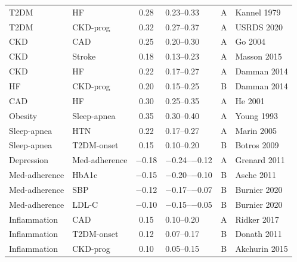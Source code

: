 \documentclass[runningheads]{llncs}
\begin{document}
{\begin{longtable}{@{}p{2.0cm}p{2.0cm}cp{1.4cm}cp{2.8cm}@{}}
T2DM & HF & 0.28 & 0.23--0.33 & A & Kannel 1979 \\
T2DM & CKD-prog & 0.32 & 0.27--0.37 & A & USRDS 2020 \\
CKD & CAD & 0.25 & 0.20--0.30 & A & Go 2004 \\
CKD & Stroke & 0.18 & 0.13--0.23 & A & Masson 2015 \\
CKD & HF & 0.22 & 0.17--0.27 & A & Damman 2014 \\
HF & CKD-prog & 0.20 & 0.15--0.25 & B & Damman 2014 \\
CAD & HF & 0.30 & 0.25--0.35 & A & He 2001 \\
Obesity & Sleep-apnea & 0.35 & 0.30--0.40 & A & Young 1993 \\
Sleep-apnea & HTN & 0.22 & 0.17--0.27 & A & Marin 2005 \\
Sleep-apnea & T2DM-onset & 0.15 & 0.10--0.20 & B & Botros 2009 \\
Depression & Med-adherence & $-$0.18 & $-$0.24--$-$0.12 & A & Grenard 2011 \\
Med-adherence & HbA1c & $-$0.15 & $-$0.20--$-$0.10 & B & Asche 2011 \\
Med-adherence & SBP & $-$0.12 & $-$0.17--$-$0.07 & B & Burnier 2020 \\
Med-adherence & LDL-C & $-$0.10 & $-$0.15--$-$0.05 & B & Burnier 2020 \\
Inflammation & CAD & 0.15 & 0.10--0.20 & A & Ridker 2017 \\
Inflammation & T2DM-onset & 0.12 & 0.07--0.17 & B & Donath 2011 \\
Inflammation & CKD-prog & 0.10 & 0.05--0.15 & B & Akchurin 2015 \\
\end{longtable}
}
\end{document}
